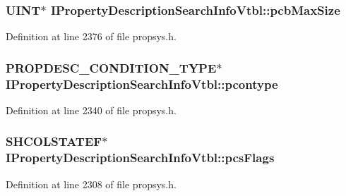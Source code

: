 \subsubsection[{\texorpdfstring{pcb\+Max\+Size}{pcbMaxSize}}]{ {\bf U\+I\+NT}$\ast$ I\+Property\+Description\+Search\+Info\+Vtbl\+::pcb\+Max\+Size}\hypertarget{struct_i_property_description_search_info_vtbl_a69463c772e84fdbf49199f282f7cb3a6}{}\label{struct_i_property_description_search_info_vtbl_a69463c772e84fdbf49199f282f7cb3a6}


Definition at line 2376 of file propsys.\+h.

\subsubsection[{\texorpdfstring{pcontype}{pcontype}}]{ {\bf P\+R\+O\+P\+D\+E\+S\+C\+\_\+\+C\+O\+N\+D\+I\+T\+I\+O\+N\+\_\+\+T\+Y\+PE}$\ast$ I\+Property\+Description\+Search\+Info\+Vtbl\+::pcontype}\hypertarget{struct_i_property_description_search_info_vtbl_afa6396ce8f079b54a3a052380250f4fc}{}\label{struct_i_property_description_search_info_vtbl_afa6396ce8f079b54a3a052380250f4fc}


Definition at line 2340 of file propsys.\+h.

\subsubsection[{\texorpdfstring{pcs\+Flags}{pcsFlags}}]{ {\bf S\+H\+C\+O\+L\+S\+T\+A\+T\+EF}$\ast$ I\+Property\+Description\+Search\+Info\+Vtbl\+::pcs\+Flags}\hypertarget{struct_i_property_description_search_info_vtbl_aee97e9952dbeac03033b495cdc14491c}{}\label{struct_i_property_description_search_info_vtbl_aee97e9952dbeac03033b495cdc14491c}


Definition at line 2308 of file propsys.\+h.

